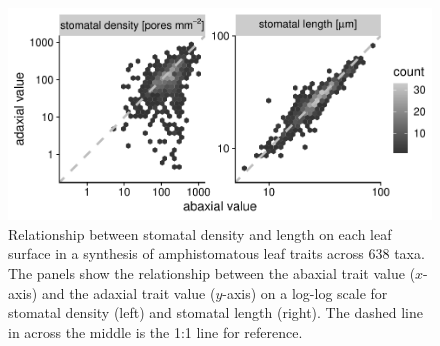 \documentclass[
  12pt,
]{article}
\begin{document}
\begin{figure}[ht]
\includegraphics[width=\textwidth]{../figures/h2-raw.pdf}
\caption{Relationship between stomatal density and length on each leaf surface in a synthesis of amphistomatous leaf traits across 638 taxa. The panels show the relationship between the abaxial trait value ($x$-axis) and the adaxial trait value ($y$-axis) on a log-log scale for stomatal density (left) and stomatal length (right). The dashed line in across the middle is the 1:1 line for reference.}
\label{fig:h2_raw}
\end{figure}
\end{document}
